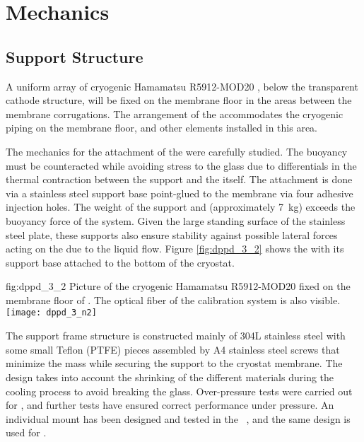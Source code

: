 \section{Mechanics}
\label{sec:dp-pds-mechanics}

\subsection{ Support Structure}
\label{subsec:dp-pds-mechanics-pmtsupport}

A uniform array of \dpnumpmtch cryogenic Hamamatsu R5912-MOD20 , below the transparent cathode structure, will be fixed on the membrane floor in the areas between the membrane corrugations. The arrangement of the  accommodates the cryogenic piping on the membrane floor, and other elements installed in this area.

The mechanics for the attachment of the  were carefully studied. The  buoyancy must be counteracted while avoiding stress to the  glass due to differentials in the thermal contraction between the support and the  itself. The attachment is done via a stainless steel support base point-glued to the membrane via four adhesive injection holes. The weight of the support and  (approximately \SI{7}{\kg}) exceeds the buoyancy force of the system. Given the large standing surface of the stainless steel plate, these supports also ensure stability against possible lateral forces acting on the  due to the liquid flow. Figure \ref{fig:dppd_3_2} shows the  with its support base attached to the bottom of the  cryostat.

\begin{dunefigure}{fig:dppd_3_2}
{Picture of the cryogenic Hamamatsu R5912-MOD20  fixed on the membrane floor of . The optical fiber of the calibration system is also visible.}
\texttt{[image: dppd\_3\_n2]}
\end{dunefigure}

The support frame structure is constructed mainly of \num{304}L stainless steel with some small Teflon (PTFE) pieces assembled by A4 stainless steel screws that minimize the mass while securing the  support to the cryostat membrane. The design %
takes into account the shrinking of the different materials during the cooling process to avoid breaking the  glass.
Over-pressure tests were carried out for , and further tests have ensured correct performance under pressure. An individual  mount has been designed and tested in the  ~\cite{Zambelli:2017dkg}, and the same design is used for .

